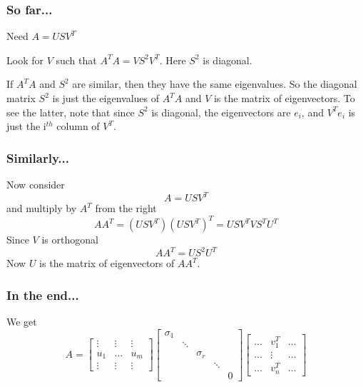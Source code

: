 \documentclass[10pt]{beamer}
\begin{document}
\begin{frame}
\frametitle{So far...}
Need $A = USV^T$
\bigskip

Look for $V$ such that $A^TA = V S^2V^T$.  Here $S^2$ is diagonal.
\bigskip

If $A^T A$ and $S^2$ are similar, then they have the same eigenvalues.  So the
diagonal matrix $S^2$ is just the eigenvalues of $A^T A$ and $V$ is the matrix
of eigenvectors.
\bigskip
To see the latter, note that since $S^2$ is diagonal, the eigenvectors
are $e_i$, and $V^Te_i$ is just the i$^{th}$ column of $V^T$.

\end{frame}
\begin{frame}
\frametitle{Similarly...}
Now consider
\[
    A = U S V^T
\]
and multiply by $A^T$ from the right
\[
    AA^T = (USV^T) (USV^T)^T = U S V^T V S^T U^T
\]
Since $V$ is orthogonal
\[
    A A^T = U S^2 U^T
\]
Now $U$ is the matrix of eigenvectors of $AA^T$.
\end{frame}
\begin{frame}
\frametitle{In the end...}
We get
\[
A =
\begin{bmatrix}
    \vdots & \vdots & \vdots\\
    u_1    & \dots  & u_m \\
    \vdots & \vdots & \vdots
\end{bmatrix}
\begin{bmatrix}
    \sigma_1 &        &          &        &\\
             & \ddots &          &        & \\
             &        & \sigma_r &        & \\
             &        &          & \ddots & \\
             &        &          &        & 0 
\end{bmatrix}
\begin{bmatrix}
    \dots & v_1^T & \dots\\
    \dots & \vdots & \dots\\
    \dots & v_n^T & \dots
\end{bmatrix}
\]
\end{frame}
\end{document}
